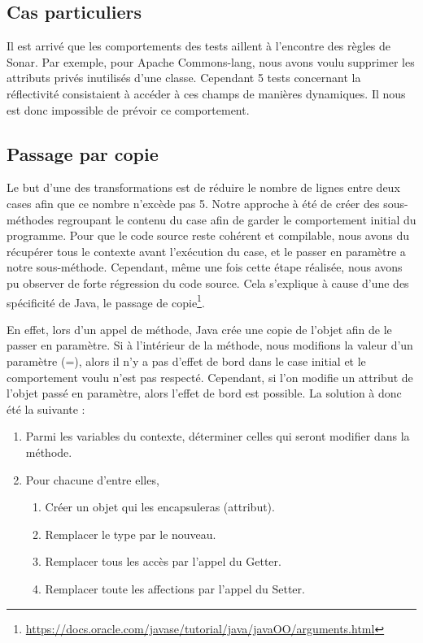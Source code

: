 \documentclass[a4paper]{article}
\begin{document}
\subsection{Cas particuliers}
\par Il est arrivé que les comportements des tests aillent à l'encontre des règles de Sonar. Par exemple, pour Apache Commons-lang, nous avons voulu supprimer les attributs privés inutilisés d'une classe. Cependant 5 tests concernant la réflectivité consistaient à accéder à ces champs de manières dynamiques. Il nous est donc impossible de prévoir ce comportement.

\subsection{Passage par copie}
\par Le but d'une des transformations est de réduire le nombre de lignes entre deux cases afin que ce nombre n'excède pas 5. Notre approche à été de créer des sous-méthodes regroupant le contenu du case afin de garder le comportement initial du programme. Pour que le code source reste cohérent et compilable, nous avons du récupérer tous le contexte avant l'exécution du case, et le passer en paramètre a notre sous-méthode. Cependant, même une fois cette étape réalisée, nous avons pu observer de forte régression du code source. Cela s'explique à cause d'une des spécificité de Java, le passage de copie\footnote{\url{https://docs.oracle.com/javase/tutorial/java/javaOO/arguments.html}}.
\\
\par 
En effet, lors d'un appel de méthode, Java crée une copie de l'objet afin de le passer en paramètre. Si à l'intérieur de la méthode, nous modifions la valeur d'un paramètre (=), alors il n'y a pas d'effet de bord dans le case initial et le comportement voulu n'est pas respecté. Cependant, si l'on modifie un attribut de l'objet passé en paramètre, alors l'effet de bord est possible. La solution à donc été la suivante :

\begin{enumerate}
	\item Parmi les variables du contexte, déterminer celles qui seront modifier dans la méthode.
	\item Pour chacune d'entre elles, 
	\begin{enumerate}
	\item Créer un objet qui les encapsuleras (attribut).
	\item Remplacer le type par le nouveau.
	\item Remplacer tous les accès par l'appel du Getter.
	\item Remplacer toute les affections par l'appel du Setter.
	\end{enumerate}
	
\end{enumerate}	
\end{document}
